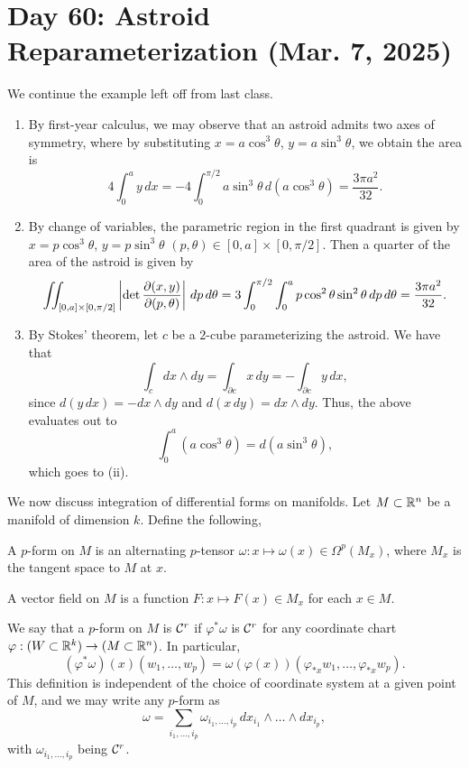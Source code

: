 \section{Day 60: Astroid Reparameterization (Mar. 7, 2025)}
We continue the example left off from last class.
\begin{enumerate}[label=(\roman*)]
    \item By first-year calculus, we may observe that an astroid admits two axes of symmetry, where by substituting $x = a \cos^3 \theta$, $y = a \sin^3 \theta$, we obtain the area is
    \[ 4 \int_0^a y \, dx = -4 \int_0^{\pi/2} a \sin^3 \theta \, d(a \cos^3 \theta) = \frac{3\pi a^2}{32}. \]
    \item By change of variables, the parametric region in the first quadrant is given by $x = p \cos^3 \theta$, $y = p \sin^3 \theta$ $(p, \theta) \in [0, a] \times [0, \pi/2]$. Then a quarter of the area of the astroid is given by
    \[ \iint_{[0, a] \times [0, \pi/2]} \left\lvert \det \frac{\partial(x, y)}{\partial(p, \theta)} \right\rvert \, dp \, d\theta = 3 \int_0^{\pi/2} \int_0^a p \cos^2 \theta \sin^2 \theta \, dp \, d\theta = \frac{3\pi a^2}{32}. \]
    \item By Stokes' theorem, let $c$ be a $2$-cube parameterizing the astroid. We have that
    \[ \int_c dx \wedge dy = \int_{\partial c} x \, dy = - \int_{\partial c} y \, dx, \]
    since $d(y \, dx) = -dx \wedge dy$ and $d(x \, dy) = dx \wedge dy$. Thus, the above evaluates out to
    \[ \int_0^a (a \cos^3 \theta) = d(a \sin^3 \theta), \]
    which goes to (ii).
\end{enumerate}
We now discuss integration of differential forms on manifolds. Let $M \subset \mathbb R^n$ be a manifold of dimension $k$. Define the following,
\begin{definition}
    A $p$-form on $M$ is an alternating $p$-tensor $\omega : x \mapsto \omega(x) \in \Omega^p(M_x)$, where $M_x$ is the tangent space to $M$ at $x$.
\end{definition}
\begin{definition}
    A vector field on $M$ is a function $F : x \mapsto F(x) \in M_x$ for each $x \in M$.
\end{definition}
\noindent We say that a $p$-form on $M$ is $\mathcal C^r$ if $\varphi^\ast \omega$ is $\mathcal C^r$ for any coordinate chart $\varphi : (W \subset \mathbb R^k) \to (M \subset \mathbb R^n)$. In particular,
\[ (\varphi^\ast \omega)(x)(w_1, \dots, w_p) = \omega(\varphi(x))(\varphi_{\ast x} w_1, \dots, \varphi_{\ast x} w_p). \]
This definition is independent of the choice of coordinate system at a given point of $M$, and we may write any $p$-form as
\[ \omega = \sum_{i_1, \dots, i_p} \omega_{i_1, \dots, i_p} \, dx_{i_1} \wedge \dots \wedge dx_{i_p}, \]
with $\omega_{i_1, \dots, i_p}$ being $\mathcal C^r$.
